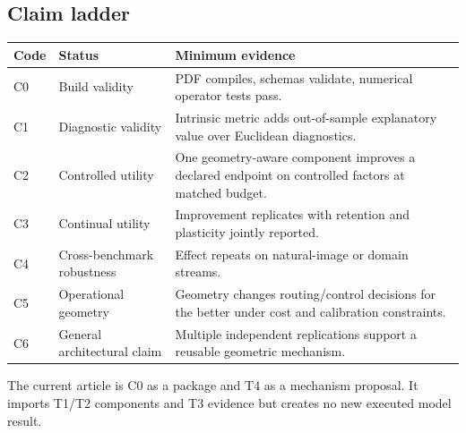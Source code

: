 \subsection{Claim ladder}
\begin{center}
\begin{tabularx}{\textwidth}{@{}llX@{}}
\toprule
Code & Status & Minimum evidence \\
\midrule
C0 & Build validity & PDF compiles, schemas validate, numerical operator tests pass. \\
C1 & Diagnostic validity & Intrinsic metric adds out-of-sample explanatory value over Euclidean diagnostics. \\
C2 & Controlled utility & One geometry-aware component improves a declared endpoint on controlled factors at matched budget. \\
C3 & Continual utility & Improvement replicates with retention and plasticity jointly reported. \\
C4 & Cross-benchmark robustness & Effect repeats on natural-image or domain streams. \\
C5 & Operational geometry & Geometry changes routing/control decisions for the better under cost and calibration constraints. \\
C6 & General architectural claim & Multiple independent replications support a reusable \MMALS{} geometric mechanism. \\
\bottomrule
\end{tabularx}
\end{center}
The current article is C0 as a package and T4 as a mechanism proposal. It imports T1/T2 components and T3 evidence but creates no new executed model result.

